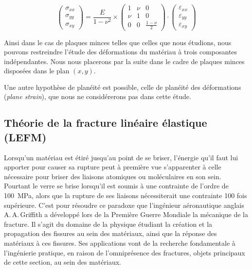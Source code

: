 \begin{equation}
\begin{pmatrix}
\sigma_{xx} \\
\sigma_{yy} \\
\sigma_{xy}
\end{pmatrix}
=
\dfrac{E}{1-\nu^2}\times\begin{pmatrix}
1 & \nu & 0 \\
\nu & 1 & 0 \\
0 & 0 & \frac{1-\nu}{2} 
\end{pmatrix}
\cdot
\begin{pmatrix}
\varepsilon_{xx} \\
\varepsilon_{yy} \\
\varepsilon_{xy}
\end{pmatrix}
\end{equation}


Ainsi dans le cas de plaques minces telles que celles que nous étudions, nous pouvons restreindre l'étude des déformations du matériau à trois composantes indépendantes. Nous nous placerons par la suite dans le cadre de plaques minces disposées dans le plan $(x,y)$.

Une autre hypothèse de planéité est possible, celle de planéité des déformations (\textit{plane strain}), que nous ne considérerons pas dans cette étude.


\subsection{Théorie de la fracture linéaire élastique (LEFM)}

Lorsqu'un matériau est étiré jusqu'au point de se briser, l'énergie qu'il faut lui apporter pour causer sa rupture peut à première vue s'apparenter à celle nécessaire pour briser des liaisons atomiques ou moléculaires en son sein. Pourtant le verre se brise lorsqu'il est soumis à une contrainte de l'ordre de \SI{100}{\mega\pascal}, alors que la rupture de ses liaisons nécessiterait une contrainte 100 fois supérieure. C'est pour résoudre ce paradoxe que l'ingénieur aéronautique anglais A.\,A.\,Griffith a développé lors de la Première Guerre Mondiale la mécanique de la fracture. Il s'agit du domaine de la physique étudiant la création et la propagation des fissures au sein des matériaux, ainsi que la réponse des matériaux à ces fissures. Ses applications vont de la recherche fondamentale à l'ingénierie pratique, en raison de l'omniprésence des fractures, objets principaux de cette section, au sein des matériaux.

